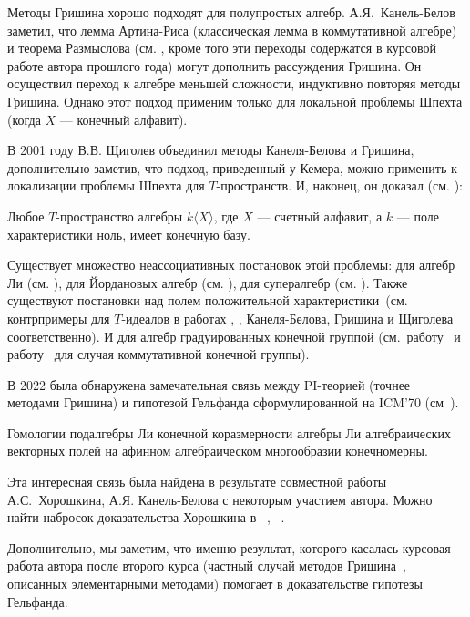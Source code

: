 Методы Гришина хорошо подходят для полупростых алгебр.
А.Я.\ Канель-Белов заметил, что лемма Артина-Риса (классическая лемма в коммутативной алгебре) и теорема Размыслова (см. \cite{GrishinSchigolev},  кроме того эти переходы содержатся в курсовой работе автора прошлого года) могут дополнить рассуждения Гришина.
Он осуществил переход к алгебре меньшей сложности, индуктивно повторяя методы Гришина.
Однако этот подход применим только для локальной проблемы Шпехта (когда $X$ — конечный алфавит).

В 2001 году В.В. Щиголев объединил методы Канеля-Белова и Гришина, дополнительно заметив, что подход, приведенный у Кемера, можно применить к локализации проблемы Шпехта для $T$-пространств.
И, наконец, он доказал (см. \cite{Shchigolev}):
\vskip 0.1in\noindent
\begin{theorem*} [В.В. Щиголев, 2001]
    Любое $T$-пространство алгебры $k\langle X\rangle$, где $X$ — счетный алфавит, а $k$ — поле характеристики ноль, имеет конечную базу.
\end{theorem*}
\vskip 0.1in\noindent

Существует множество неассоциативных постановок этой проблемы: для алгебр Ли (см. \cite{Lie}), для Йордановых алгебр (см. \cite{Jordan}), для супералгебр (см. \cite{Super}).
Также существуют постановки над полем положительной характеристики\ (см. контрпримеры для $T$-идеалов в работах \cite{ConterKanel}, \cite{ConterGrishin}, \cite{ConterShchigolev} Канеля-Белова, Гришина и Щиголева соответственно).
И для алгебр градуированных конечной группой (см.\ работу~\cite{GradedKanel} и работу~\cite{GradedSviridova} для случая коммутативной конечной группы).

В 2022 была обнаружена замечательная связь между PI-теорией (точнее методами Гришина) и гипотезой Гельфанда сформулированной на ICM’70 (см\ \cite{Gelfand}).
\vskip 0.1in\noindent
\begin{conjecture}[Гельфанд, 1970]
    \label{Gelfand}
    Гомологии подалгебры Ли конечной коразмерности алгебры Ли алгебраических векторных полей на афинном алгебраическом многообразии конечномерны.
\end{conjecture}
\vskip 0.1in\noindent
Эта интересная связь была найдена в результате совместной работы А.С.\ Хорошкина, А.Я. Канель-Белова с некоторым участием автора.
Можно найти набросок доказательства Хорошкина в ~\cite{Feigin-Kanel-Khoroshkin}, ~\cite{Centrone-Kanel-Khoroshkin-Vorobiov}.

Дополнительно, мы заметим, что именно результат, которого касалась курсовая работа автора после второго курса (частный случай методов Гришина\ \cite{Grishin}, описанных элементарными методами) помогает в доказательстве гипотезы Гельфанда.